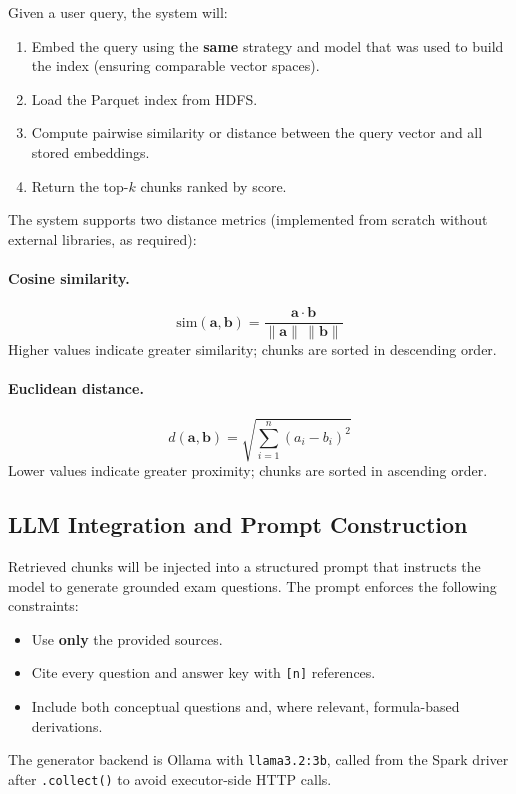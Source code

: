 \documentclass[a4paper,11pt]{article}
\begin{document}
Given a user query, the system will:
\begin{enumerate}[noitemsep]
  \item Embed the query using the \textbf{same} strategy and model that was
        used to build the index (ensuring comparable vector spaces).
  \item Load the Parquet index from HDFS.
  \item Compute pairwise similarity or distance between the query vector and
        all stored embeddings.
  \item Return the top-$k$ chunks ranked by score.
\end{enumerate}

The system supports two distance metrics (implemented from scratch without
external libraries, as required):

\paragraph{Cosine similarity.}
\[
  \text{sim}(\mathbf{a}, \mathbf{b})
  = \frac{\mathbf{a} \cdot \mathbf{b}}{\|\mathbf{a}\| \, \|\mathbf{b}\|}
\]
Higher values indicate greater similarity; chunks are sorted in descending
order.

\paragraph{Euclidean distance.}
\[
  d(\mathbf{a}, \mathbf{b})
  = \sqrt{\sum_{i=1}^{n} (a_i - b_i)^2}
\]
Lower values indicate greater proximity; chunks are sorted in ascending order.

\subsection{LLM Integration and Prompt Construction}

Retrieved chunks will be injected into a structured prompt that instructs the
model to generate grounded exam questions. The prompt enforces the following
constraints:
\begin{itemize}[noitemsep]
  \item Use \textbf{only} the provided sources.
  \item Cite every question and answer key with \texttt{[n]} references.
  \item Include both conceptual questions and, where relevant, formula-based
        derivations.
\end{itemize}

The generator backend is Ollama with \texttt{llama3.2:3b}, called from the
Spark driver after \texttt{.collect()} to avoid executor-side HTTP calls.
\end{document}
